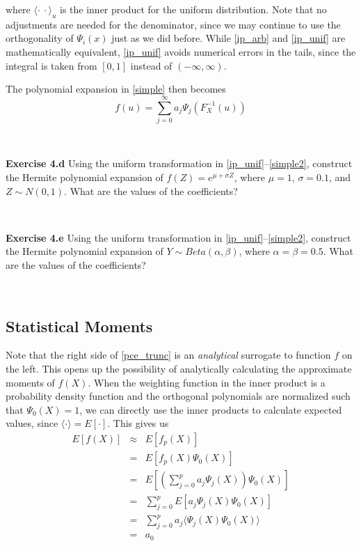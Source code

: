 \documentclass[11pt]{article}
\numberwithin{equation}{section}
\begin{document}
where $\langle \cdot \ \cdot \rangle_u$ is the inner product for the uniform distribution. Note that no adjustments are needed for the denominator, since we may continue to use the orthogonality of $\Psi_i(x)$ just as we did before. While \eqref{ip_arb} and \eqref{ip_unif} are mathematically equivalent, \eqref{ip_unif} avoids numerical errors in the tails, since the integral is taken from $[0, 1]$ instead of $(-\infty, \infty)$.

\qquad The polynomial expansion in \eqref{simple} then becomes
\begin{equation}
f(u) = \sum_{j=0}^{\infty}  a_j \Psi_j(F_X^{-1}(u)) \label{simple2}
\end{equation}


\

\textbf{Exercise 4.d} Using the uniform transformation in \eqref{ip_unif}--\eqref{simple2}, construct the Hermite polynomial expansion of $f(Z) = e^{\mu + \sigma Z}$, where $\mu = 1$, $\sigma = 0.1$, and $Z \sim N(0,1)$. What are the values of the coefficients?

\

\textbf{Exercise 4.e} Using the uniform transformation in \eqref{ip_unif}--\eqref{simple2}, construct the Hermite polynomial expansion of $Y \sim Beta(\alpha, \beta)$, where $\alpha = \beta = 0.5$. What are the values of the coefficients?

\





\subsection{Statistical Moments}

Note that the right side of \eqref{pce_trunc} is an {\em analytical} surrogate to function $f$ on the left. This opens up the possibility of analytically calculating the approximate moments of $f(X)$. When the weighting function in the inner product is a probability density function and the orthogonal polynomials are normalized such that $\Psi_0(X) = 1$, we can directly use the inner products to calculate expected values, since $\langle \cdot \rangle = E[ \cdot]$. This gives us
\begin{eqnarray}
E [ f(X) ] & \approx & E [ f_p(X) ] \nonumber \\
& = & E [ f_p(X) \Psi_0(X) ] \nonumber \\
& = & E \left[ \left( \sum_{j = 0}^p a_j \Psi_j(X) \right) \Psi_0(X) \right] \nonumber \\
& = & \sum_{j = 0}^p  E \left[ a_j \Psi_j(X) \Psi_0(X) \right] \nonumber \\
& = & \sum_{j = 0}^p   a_j \langle \Psi_j(X) \Psi_0(X) \rangle  \nonumber \\
& = & a_0 \label{pce_mu}
\end{eqnarray}
\end{document}
